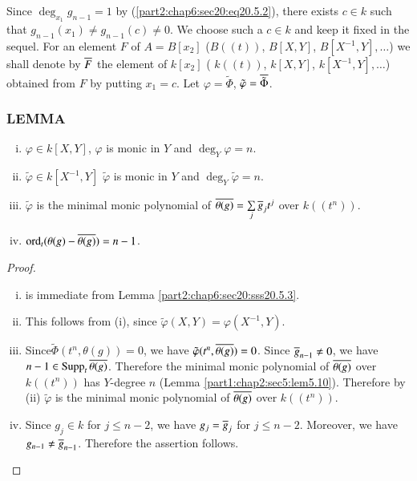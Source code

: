 Since $\deg_{x_1}g_{n-1}= 1$ by (\ref{part2:chap6:sec20:eq20.5.2}),
there exists $c \in k$ such that $g_{n-1} (x_1)\neq g_{n-1}(c) \neq
0$. We choose such a $c \in k$ and keep it fixed in the sequel. For an
element $F$ of $A= B[x_2]$ (\resp $B((t))$, $B[X, Y]$, $B[X^{-1}, Y],
\ldots $) we shall denote by $\overline{F}$ the element of $k[x_2]$ (\resp
$k((t))$, $k[X, Y]$, $k[X^{-1}, Y], \ldots$) obtained from $F$ by
putting $x_1=c$. Let $\varphi= \tilde{\Phi}$, $\tilde{\varphi} =
\overline{\tilde{\Phi}}$.

\subsubsection{LEMMA}\label{part2:chap6:sec20:sss20.5.5}
\begin{enumerate}[(i)]
\item $\varphi \in k[X, Y]$, $\varphi$ is monic in $Y$ and $\deg_Y
  \varphi=n$.
  \item $\tilde{\varphi} \in k [X^{-1}, Y]$ $\tilde{\varphi}$ is monic
    in $Y$ and $\deg_Y \tilde{\varphi} =n$.
    \item $\tilde{\varphi}$ is the minimal monic polynomial of
      $\overline{\theta(g)}= \sum\limits_j \overline{g}_j t^j$ over $k((t^n))$.
      \item $\operatorname{ord}_t (\theta(g)- \overline{\theta (g)})= n-1$.
\end{enumerate}

\begin{proof}
  ~
\begin{enumerate}[(i)]
\item is immediate from Lemma \ref{part2:chap6:sec20:sss20.5.3}.
\item This follows from (i), since $\tilde{\varphi} (X, Y)=
  \varphi(X^{-1}, Y)$.
  \item Since\pageoriginale $\tilde{\Phi} (t^n , \theta (g))=0$, we
    have $\tilde{\varphi} (t^n, \overline{\theta(g)})=0$. Since
    $\overline{g}_{n-1}\neq 0$, we have $n- 1 \in \operatorname{Supp}_t
    \overline{\theta(g)}$. Therefore the minimal monic polynomial of
    $\overline{\theta (g)}$ over $k((t^n))$ has $Y$-degree $n$ (Lemma
    \ref{part1:chap2:sec5:lem5.10}). Therefore by (ii)
    $\tilde{\varphi}$ is the minimal monic polynomial of
    $\overline{\theta(g)}$ over $k((t^n))$.

\item Since $g_j \in k$ for $j \leq n-2$, we have $g_j= \overline{g}_j$ for
  $j \leq n-2$. Moreover, we have $g_{n-1} \neq
  \overline{g}_{n-1}$. Therefore the assertion follows.
\end{enumerate}
\end{proof}

